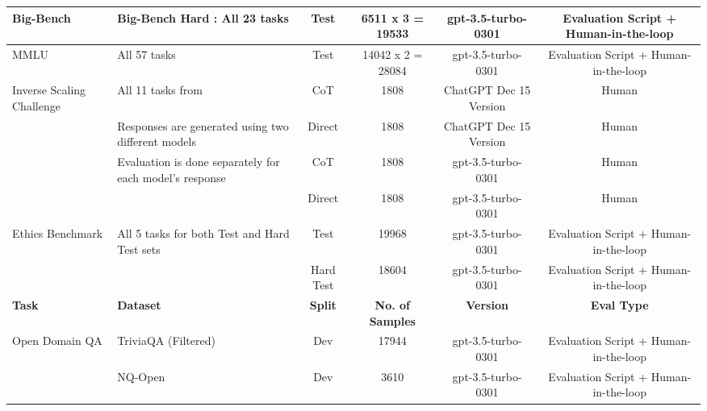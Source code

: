 \documentclass[11pt]{article}
\begin{document}
\begin{table*}
{\begin{tabular}{llcccc}
{Big-Bench \cite{srivastava2022beyond}}              & {Big-Bench Hard \cite{suzgun2022challenging}: All 23 tasks}   &  {Test} &   {6511 x 3 = 19533} & {gpt-3.5-turbo-0301} & {Evaluation Script + Human-in-the-loop} \\


\midrule

{MMLU \cite{hendrycksmeasuring} }              & {All 57 tasks}   &  {Test} &   {14042 x 2 = 28084} &  {gpt-3.5-turbo-0301} & {Evaluation Script + Human-in-the-loop} \\


\midrule

{Inverse Scaling Challenge}              & {All 11 tasks from \cite{wei2022inverse}}  &  CoT  &   {1808} & {ChatGPT Dec 15 Version} & {Human}  \\
{\cite{perez_mckenzie}} & {Responses are generated using two different models}  & Direct & 1808 & ChatGPT Dec 15 Version & Human \\ 

           &  {Evaluation is done separately for each model's response} &  CoT  &   {1808} & {gpt-3.5-turbo-0301} & {Human}  \\
 &  & Direct & 1808 & gpt-3.5-turbo-0301 & Human \\ 

\midrule


{Ethics Benchmark}              & {All 5 tasks for both Test and Hard Test sets}  &  Test  &   {19968} & {gpt-3.5-turbo-0301} & {Evaluation Script + Human-in-the-loop}  \\
{\cite{hendrycks2021ethics}} &  & Hard Test & 18604 & gpt-3.5-turbo-0301 & Evaluation Script + Human-in-the-loop \\


\midrule

\textbf{Task}                               & \textbf{Dataset}     & \textbf{Split}         & \textbf{No. of Samples} & \textbf{Version} & \textbf{Eval Type}\\
\midrule


       {Open Domain QA}          & {TriviaQA  (Filtered) \cite{joshi2017triviaqa}}   &  Dev &   {17944} & {gpt-3.5-turbo-0301} & {Evaluation Script + Human-in-the-loop } \\

          & {NQ-Open \cite{kwiatkowski2019naturalquestions}}   &  Dev &   {3610} & {gpt-3.5-turbo-0301} & {Evaluation Script + Human-in-the-loop } \\


\end{tabular}}
\end{table*}
\end{document}
